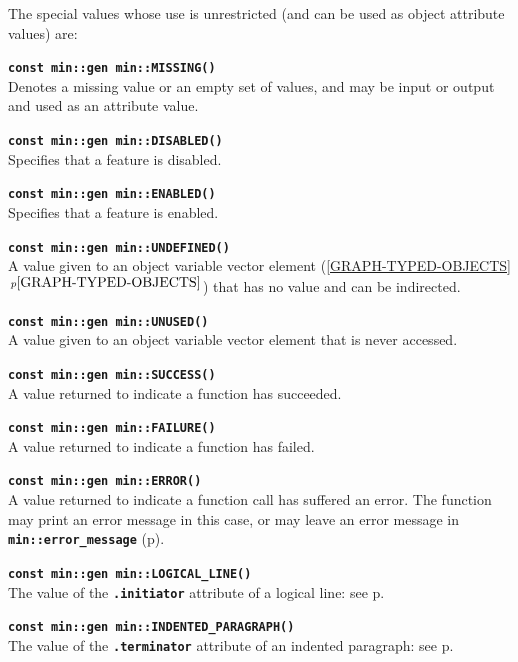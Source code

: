 \documentclass[12pt]{article}
\makeatletter
\newcommand{\TT}[1]{{\tt \bfseries #1}}
\newcommand{\ttindex}[1]{\index{#1@{\tt #1}}}
\newcommand{\itemref}[1]{\ref{#1}$\,^{p\pageref{#1}}$}
\newcommand{\pagref}[1]{p\pageref{#1}}
\newcommand{\EOL}{\penalty \exhyphenpenalty}
\newenvironment{indpar}[1][0.3in]%
	{\begin{list}{}%
		     {\setlength{\itemsep}{0in}%
		      \setlength{\topsep}{0in}%
		      \setlength{\parsep}{1ex}%
		      \setlength{\labelwidth}{#1}%
		      \setlength{\leftmargin}{#1}%
		      \addtolength{\leftmargin}{\labelsep}}%
	 \item}%
	{\end{list}}
\newcommand{\LABEL}[1]{\label{#1}}
\newcommand{\MINKEY}[1]%
	   {\TT{#1}\ttindex{min::#1}\ttindex{#1}}
\makeatother
\begin{document}
The special values whose use is unrestricted
(and can be used as object attribute values) are:

\begin{indpar}
\begin{list}{}{}
\item[\TT{const min::gen min::}\MINKEY{MISSING()}]~%
	\LABEL{MIN::MISSING}\\
Denotes a missing value or an empty set of values, and may be input
or output and used as an attribute value.
\item[\TT{const min::gen min::}\MINKEY{DISABLED()}]~%
	\LABEL{MIN::DISABLED}\\
Specifies that a feature is disabled.
\item[\TT{const min::gen min::}\MINKEY{ENABLED()}]~%
	\LABEL{MIN::ENABLED}\\
Specifies that a feature is enabled.
\item[\TT{const min::gen min::}\MINKEY{UNDEFINED()}]~%
	\LABEL{MIN::UNDEFINED}\\
A value given to an object variable vector element
(\itemref{GRAPH-TYPED-OBJECTS}) that has no value and can be indirected.
\item[\TT{const min::gen min::}\MINKEY{UNUSED()}]~%
	\LABEL{MIN::UNUSED}\\
A value given to an object variable vector element that is never accessed.
\item[\TT{const min::gen min::}\MINKEY{SUCCESS()}]~%
	\LABEL{MIN::SUCCESS}\\
A value returned to indicate a function has succeeded.
\item[\TT{const min::gen min::}\MINKEY{FAILURE()}]~%
	\LABEL{MIN::FAILURE}\\
A value returned to indicate a function has failed.
\item[\TT{const min::gen min::}\MINKEY{ERROR()}]~%
	\LABEL{MIN::ERROR}\\
A value returned to indicate a function call has suffered an error.
The function may print an error message in
this case, or may leave an error message in
\TT{min::\EOL error\_\EOL message} (\pagref{ERROR_MESSAGE}).
\item[\TT{const min::gen min::}\MINKEY{LOGICAL\_LINE()}]~%
	\LABEL{MIN::LOGICAL_LINE}\\
The value of the \TT{.initiator} attribute of a logical line:
see \pagref{LOGICAL-LINE-COMPACT-FORMAT}.
\item[\TT{const min::gen min::}\MINKEY{INDENTED\_PARAGRAPH()}]~%
	\LABEL{MIN::INDENTED_PARAGRAPH}\\
The value of the \TT{.terminator} attribute of an indented paragraph:
see \pagref{INDENTED-PARAGRAPH-COMPACT-FORMAT}.
\end{list}
\end{indpar}
\end{document}
